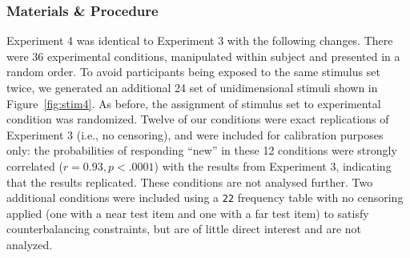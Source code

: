 \documentclass[doc]{apa6}
\newcommand{\dist}[1]{\texttt{#1}}
\begin{document}
\subsubsection{Materials \& Procedure} Experiment 4 was identical to Experiment 3 with the following changes. There were 36 experimental conditions, manipulated within subject and presented in a random order. To avoid participants being exposed to the same stimulus set twice, we generated an additional 24 set of unidimensional stimuli shown in Figure~\ref{fig:stim4}. As before, the assignment of stimulus set to experimental condition was randomized. Twelve of our conditions were exact replications of Experiment 3 (i.e., no censoring), and were included for calibration purposes only: the probabilities of responding ``new'' in these 12 conditions were strongly correlated  ($r=0.93, p<.0001$) with the results from Experiment 3, indicating that the results replicated. These conditions are not analysed further. Two additional conditions were included using a \dist{22} frequency table with no censoring applied (one with a near test item and one with a far test item) to satisfy counterbalancing constraints, but are of little direct interest and are not analyzed.
\end{document}
